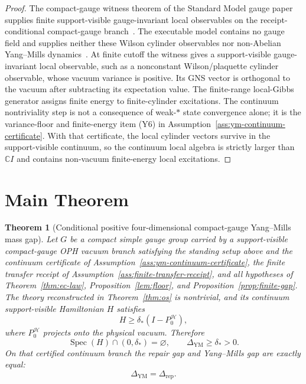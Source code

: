 \documentclass[11pt]{article}
\numberwithin{equation}{section}
\newtheorem{theorem}{Theorem}[section]
\theoremstyle{remark}
\newcommand{\YM}{\mathrm{YM}}
\newcommand{\Hcal}{\mathcal H}
\newcommand{\C}{\mathbb C}
\begin{document}
\begin{proof}
The compact-gauge witness theorem of the Standard Model gauge paper supplies finite
support-visible gauge-invariant local observables on the receipt-conditional compact-gauge
branch~\cite{oph2}. The executable model contains no gauge field and supplies neither these Wilson
cylinder observables nor non-Abelian Yang--Mills dynamics~\cite{ophmodel}. At finite cutoff the witness gives a
support-visible gauge-invariant local observable, such as a nonconstant Wilson/plaquette cylinder
observable, whose vacuum variance is positive. Its GNS vector is orthogonal to the vacuum after
subtracting its expectation value. The finite-range local-Gibbs generator assigns finite energy to
finite-cylinder excitations. The continuum nontriviality step is not a consequence of weak-\(*\)
state convergence alone; it is the variance-floor and finite-energy item (Y6) in
Assumption~\ref{ass:ym-continuum-certificate}. With that certificate, the local cylinder vectors
survive in the support-visible continuum, so the continuum local algebra is strictly larger than
\(\C I\) and contains non-vacuum finite-energy local excitations.
\end{proof}

\section{Main Theorem}

\begin{theorem}[Conditional positive four-dimensional compact-gauge Yang--Mills mass gap]
\label{thm:main}
Let \(G\) be a compact simple gauge group carried by a support-visible compact-gauge OPH vacuum
branch satisfying the standing setup above and the continuum certificate of
Assumption~\ref{ass:ym-continuum-certificate}, the finite transfer receipt of
Assumption~\ref{ass:finite-transfer-receipt}, and all hypotheses of
Theorem~\ref{thm:ec-law}, Proposition~\ref{lem:floor}, and
Proposition~\ref{prop:finite-gap}. The theory reconstructed in
Theorem~\ref{thm:os}
is nontrivial, and its continuum support-visible Hamiltonian \(H\) satisfies
\[
H\ge \delta_*(I-P_0^{\Hcal}),
\tag{10}
\]
where \(P_0^{\Hcal}\) projects onto the physical vacuum. Therefore
\[
\operatorname{Spec}(H)\cap(0,\delta_*)=\varnothing,
\qquad
\Delta_{\YM}\ge \delta_*>0.
\tag{11}
\]
On that certified continuum branch the repair gap and Yang--Mills gap are exactly equal:
\[
\Delta_{\YM}=\Delta_{\mathrm{rep}}.
\tag{12}
\]
\end{theorem}
\end{document}
